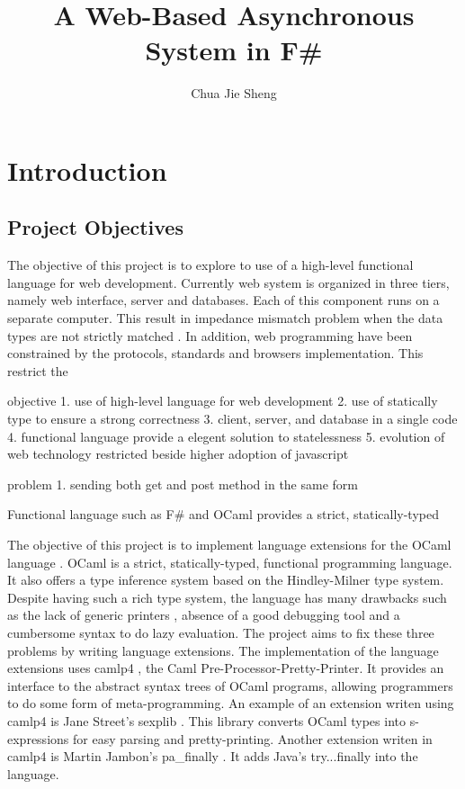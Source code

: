 \documentclass[12pt,fullpage]{article}
\begin{document}
\title{A Web-Based Asynchronous System in F#}
\author{Chua Jie Sheng}
\maketitle

\section{Introduction}
\subsection{Project Objectives}

The objective of this project is to explore to use of a high-level functional
language for web development. Currently web system is organized in three tiers,
namely web interface, server and databases. Each of this component runs on a
separate computer. This result in impedance mismatch problem when the data types
are not strictly matched \cite{links-fmco06}. In addition, web programming have
been constrained by the protocols, standards and browsers implementation. This
restrict the

objective
1. use of high-level language for web development
2. use of statically type to ensure a strong correctness
3. client, server, and database in a single code
4. functional language provide a elegent solution to statelessness
5. evolution of web technology restricted beside higher adoption of javascript

problem
1. sending both get and post method in the same form


Functional language such as F# and
OCaml provides a strict, statically-typed

The objective of this project is to implement language extensions for
the OCaml language \cite{ocaml-website}. OCaml is a strict,
statically-typed, functional programming language. It also offers a type
inference system based on the Hindley-Milner type system. Despite
having such a rich type system, the language has many drawbacks such
as the lack of generic printers \cite{minsky08} , absence of a good
debugging tool and a cumbersome syntax to do lazy evaluation. The
project aims to fix these three problems by writing language
extensions. The implementation of the language extensions uses camlp4
\cite{camlp4-website} , the Caml Pre-Processor-Pretty-Printer. It
provides an interface to the abstract syntax trees of OCaml
programs, allowing programmers to do some form of meta-programming.
An example of an extension writen using camlp4 is Jane Street's
sexplib \cite{sexplib-website} . This library converts OCaml types
into s-expressions for easy parsing and pretty-printing. Another
extension writen in camlp4 is Martin Jambon's pa\_finally
\cite{pa-finally-website} . It adds Java's try...finally into the language.
\end{document}
